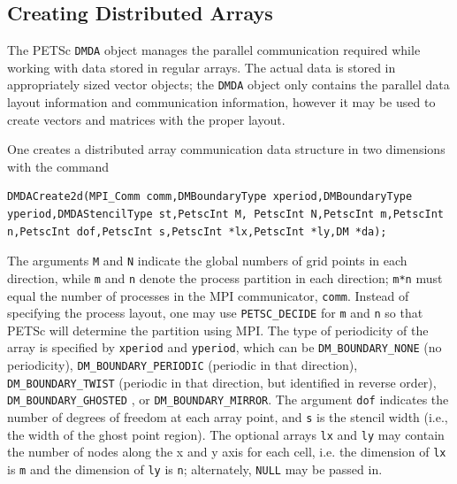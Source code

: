 \subsection{Creating Distributed Arrays}

The PETSc \lstinline{DMDA} object manages the parallel communication required
while working with data stored in regular arrays. The actual data
is stored in appropriately sized vector objects; the \lstinline{DMDA} object
only contains the parallel data layout information and communication
information, however it may be used to create vectors and matrices with the
proper layout.

One creates a distributed array communication data structure
in two dimensions with the command
\begin{lstlisting}
DMDACreate2d(MPI_Comm comm,DMBoundaryType xperiod,DMBoundaryType yperiod,DMDAStencilType st,PetscInt M, PetscInt N,PetscInt m,PetscInt n,PetscInt dof,PetscInt s,PetscInt *lx,PetscInt *ly,DM *da);
\end{lstlisting}
The   arguments
 \lstinline{M} and \lstinline{N} indicate the global
numbers of grid points in each direction, while \lstinline{m} and \lstinline{n}
denote the process partition in each direction; \lstinline{m*n} must equal
the number of processes in the MPI communicator, \lstinline{comm}.
Instead of specifying the process layout, one may use
\lstinline{PETSC_DECIDE} for \lstinline{m} and \lstinline{n}
so that PETSc will determine the partition using MPI. The type of
periodicity of the array is specified by \lstinline{xperiod} and \lstinline{yperiod}, which can be
\lstinline{DM_BOUNDARY_NONE}  (no periodicity),
\lstinline{DM_BOUNDARY_PERIODIC}  (periodic in that direction),
\lstinline{DM_BOUNDARY_TWIST}  (periodic in that direction, but identified in reverse order),
\lstinline{DM_BOUNDARY_GHOSTED} ,
or \lstinline{DM_BOUNDARY_MIRROR}.  The argument \lstinline{dof}
indicates the number of degrees of freedom at each array point,
and \lstinline{s} is the stencil width (i.e., the width of the ghost point region).
The optional arrays \lstinline{lx} and \lstinline{ly} may contain the number of nodes
along the x and y axis for each cell, i.e. the dimension of \lstinline{lx} is
\lstinline{m} and the dimension of \lstinline{ly} is \lstinline{n}; alternately, \lstinline{NULL} may be passed in.

